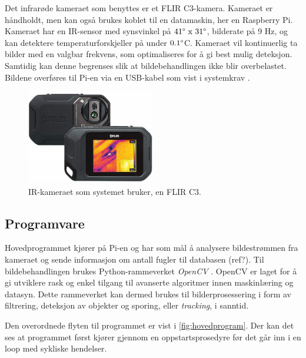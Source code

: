 Det infrarøde kameraet som benyttes er et FLIR C3-kamera. 
Kameraet er håndholdt, men kan også brukes koblet til en datamaskin, her en Raspberry Pi. 
Kameraet har en IR-sensor med synsvinkel på $41\degree \text{ x } 31\degree$, bilderate på 9 Hz, og kan detektere temperaturforskjeller på under $0.1\degree$C. 
Kameraet vil kontinuerlig ta bilder med en valgbar frekvens, som optimaliseres for å gi best mulig deteksjon. 
Samtidig kan denne begrenses slik at bildebehandlingen ikke blir overbelastet. 
Bildene overføres til Pi-en via en USB-kabel som vist i systemkrav .


\begin{figure}[H]
    \centering
    \includegraphics[width=0.5\textwidth]{implementering/c3.png}
    \caption{IR-kameraet som systemet bruker, en FLIR C3.}
    \label{fig:c3}
\end{figure}


\subsection{Programvare}\label{sec:impl:programvare} 

Hovedprogrammet kjører på Pi-en og har som mål å analysere bildestrømmen fra kameraet og sende informasjon om antall fugler til databasen (ref?). Til bildebehandlingen brukes Python-rammeverket \textit{OpenCV} \cite{OpenCV}. OpenCV er laget for å gi utviklere rask og enkel tilgang til avanserte algoritmer innen maskinlæring og datasyn. Dette rammeverket kan dermed brukes til bilderprosessering i form av filtrering, deteksjon av objekter og sporing, eller \textit{tracking}, i sanntid. 

Den overordnede flyten til programmet er vist i \autoref{fig:hovedprogram}. 
Der kan det ses at programmet først kjører gjennom en oppstartsprosedyre før det går inn i en loop med sykliske hendelser.

